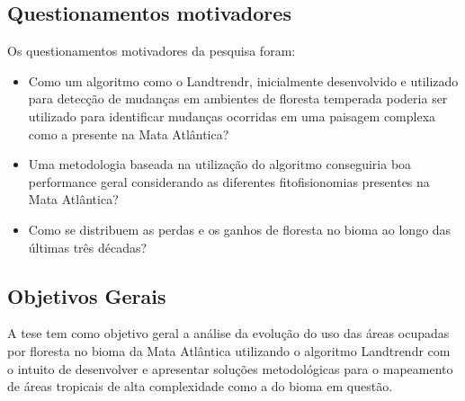 \newpage

\subsection*{Questionamentos motivadores}
Os questionamentos motivadores da pesquisa foram:
\begin{itemize}
    \item Como um algoritmo como o Landtrendr, inicialmente desenvolvido e utilizado para detecção de mudanças em ambientes de floresta temperada poderia ser utilizado para identificar mudanças ocorridas em uma paisagem complexa como a presente na Mata Atlântica? 
    
    \item Uma metodologia baseada na utilização do algoritmo conseguiria boa performance geral considerando as diferentes fitofisionomias presentes na Mata Atlântica?
    
    \item Como se distribuem as perdas e os ganhos de floresta no bioma ao longo das últimas três décadas? 
    
\end{itemize}

\subsection*{Objetivos Gerais}
\hspace{13pt}  A tese tem como objetivo geral a análise da evolução do uso das áreas ocupadas por floresta no bioma da Mata Atlântica utilizando o algoritmo Landtrendr com o intuito de desenvolver e apresentar soluções metodológicas para o mapeamento de áreas tropicais de alta complexidade como a do bioma em questão.

